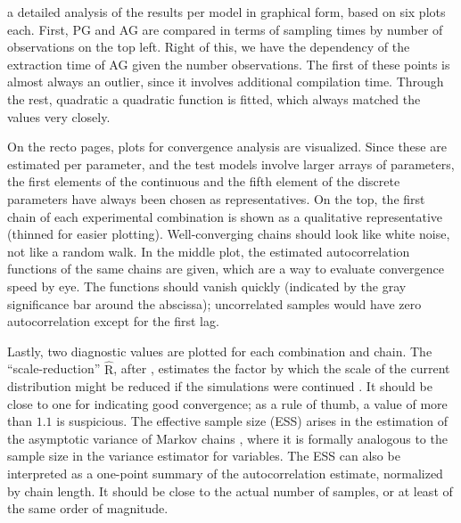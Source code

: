  a detailed analysis of the results per model in graphical form, based on six
plots each.  First, PG and AG are compared in terms of sampling times by number of observations on
the top left.  Right of this, we have the dependency of the extraction time of AG given the number
observations.  The first of these points is almost always an outlier, since it involves additional
compilation time.  Through the rest, quadratic a quadratic function is fitted, which always matched
the values very closely.  

On the recto pages, plots for convergence analysis are visualized.  Since these are estimated per
parameter, and the test models involve larger arrays of parameters, the first elements of the
continuous and the fifth element of the discrete parameters have always been chosen as
representatives.  On the top, the first chain of each experimental combination is shown as a
qualitative representative (thinned for easier plotting).  Well-converging chains should look like
white noise, not like a random walk.  In the middle plot, the estimated autocorrelation functions of
the same chains are given, which are a way to evaluate convergence speed by eye.  The functions
should vanish quickly (indicated by the gray significance bar around the abscissa); uncorrelated
samples would have zero autocorrelation except for the first lag.

Lastly, two diagnostic values are plotted for each combination and chain.  The
\enquote{scale-reduction} \(\widehat{\mathrm{R}}\), after \textcite{gelman1992inference}, estimates
the factor by which the scale of the current distribution might be reduced if the simulations were
continued \parencite[see][p. 285]{gelman2020bayesian}.  It should be close to one for indicating
good convergence; as a rule of thumb, a value of more than \(1.1\) is suspicious.  The effective
sample size (ESS) arises in the estimation of the asymptotic variance of Markov chains
\parencite[][section 7.2]{vihola2020lectures}, where it is formally analogous to the sample size in
the variance estimator for \iid{} variables.  The ESS can also be interpreted as a one-point summary
of the autocorrelation estimate, normalized by chain length.  It should be close to the actual
number of samples, or at least of the same order of magnitude.


